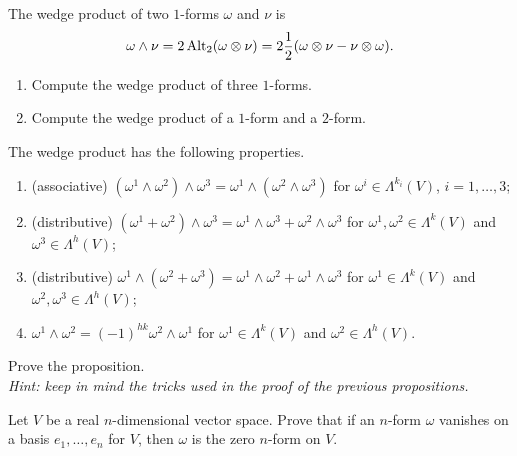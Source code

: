 \begin{example}
  The wedge product of two $1$-forms $\omega$ and $\nu$ is
  \begin{equation}
    \omega\wedge\nu = 2\operatorname{Alt}_2(\omega\otimes\nu) = 2 \frac12 (\omega \otimes \nu - \nu \otimes \omega).
  \end{equation}
\end{example}

\begin{exercise}
  \begin{enumerate}
    \item Compute the wedge product of three $1$-forms.
    \item Compute the wedge product of a $1$-form and a $2$-form.
  \end{enumerate}
\end{exercise}

\begin{proposition}
  The wedge product has the following properties.
  \begin{enumerate}
    \item (associative) $(\omega^1\wedge\omega^2)\wedge\omega^3 = \omega^1\wedge(\omega^2\wedge\omega^3)$ for $\omega^i\in\Lambda^{k_i}(V)$, $i=1,\ldots, 3$;
    \item (distributive) $(\omega^1+\omega^2)\wedge\omega^3 = \omega^1\wedge\omega^3+\omega^2\wedge\omega^3$ for $\omega^1,\omega^2\in\Lambda^{k}(V)$ and $\omega^3\in\Lambda^h(V)$;
    \item (distributive) $\omega^1\wedge(\omega^2+\omega^3) = \omega^1\wedge\omega^2+\omega^1\wedge\omega^3$ for $\omega^1\in\Lambda^{k}(V)$ and $\omega^2,\omega^3\in\Lambda^h(V)$;
    \item $\omega^1\wedge\omega^2 = {(-1)}^{hk}\omega^2\wedge\omega^1$ for $\omega^1\in\Lambda^{k}(V)$ and $\omega^2\in\Lambda^h(V)$.
  \end{enumerate}
\end{proposition}
\begin{exercise}
  Prove the proposition.\\
  \textit{\small Hint: keep in mind the tricks used in the proof of the previous propositions.}
\end{exercise}

\begin{exercise}\label{ex:zeroform}
  Let $V$ be a real $n$-dimensional vector space.
  Prove that if an $n$-form $\omega$ vanishes on a basis $e_1,\ldots,e_n$ for $V$, then $\omega$ is the zero $n$-form on $V$.
\end{exercise}

